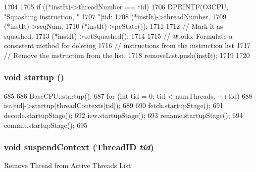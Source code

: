 \begin{DoxyCode}
1704 {
1705     if ((*instIt)->threadNumber == tid) {
1706         DPRINTF(O3CPU, "Squashing instruction, "
1707                 "[tid:%
1708                 (*instIt)->threadNumber,
1709                 (*instIt)->seqNum,
1710                 (*instIt)->pcState());
1711 
1712         // Mark it as squashed.
1713         (*instIt)->setSquashed();
1714 
1715         // @todo: Formulate a consistent method for deleting
1716         // instructions from the instruction list
1717         // Remove the instruction from the list.
1718         removeList.push(instIt);
1719     }
1720 }
\end{DoxyCode}
\hypertarget{classFullO3CPU_aecc7d8debf54990ffeaaed5bac7d7d81}{
\subsubsection[{startup}]{\setlength{\rightskip}{0pt plus 5cm}void startup ()}}
\label{classFullO3CPU_aecc7d8debf54990ffeaaed5bac7d7d81}



\begin{DoxyCode}
685 {
686     BaseCPU::startup();
687     for (int tid = 0; tid < numThreads; ++tid)
688         isa[tid]->startup(threadContexts[tid]);
689 
690     fetch.startupStage();
691     decode.startupStage();
692     iew.startupStage();
693     rename.startupStage();
694     commit.startupStage();
695 }
\end{DoxyCode}
\hypertarget{classFullO3CPU_aed2e2b9af515a66bdde61b85f150856a}{
\subsubsection[{suspendContext}]{\setlength{\rightskip}{0pt plus 5cm}void suspendContext ({\bf ThreadID} {\em tid})}}
\label{classFullO3CPU_aed2e2b9af515a66bdde61b85f150856a}
Remove Thread from Active Threads List 


